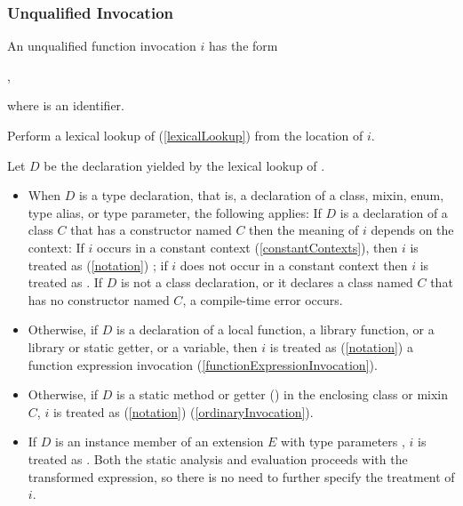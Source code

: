 \documentclass[makeidx]{article}
\begin{document}
{\subsubsection{Unqualified Invocation}

\LMHash{}%
An unqualified function invocation $i$ has the form

\noindent
{},

\noindent
where \id{} is an identifier.


\LMHash{}%
Perform a lexical lookup of \id{}
(\ref{lexicalLookup})
from the location of $i$.

\LMHash{}%
Let $D$ be the declaration yielded by the lexical lookup of \id.

\begin{itemize}
\item
  When $D$ is a type declaration, that is,
  a declaration of a class, mixin, enum, type alias, or type parameter,
  the following applies:
  If $D$ is a declaration of a class $C$
  that has a constructor named $C$
  then the meaning of $i$ depends on the context:
  If $i$ occurs in a constant context
  (\ref{constantContexts}),
  then $i$ is treated as
  (\ref{notation})
  ;
  if $i$ does not occur in a constant context
  then $i$ is treated as .
  If $D$ is not a class declaration,
  or it declares a class named $C$ that has no constructor named $C$,
  a compile-time error occurs.
\item
  Otherwise, if $D$ is a declaration of
  a local function,
  a library function, or
  a library or static getter, or a variable,
  then $i$ is treated as
  (\ref{notation})
  a function expression invocation
  (\ref{functionExpressionInvocation}).
\item
  Otherwise, if $D$ is
  a static method or getter
  ()
  in the enclosing class or mixin $C$,
  $i$ is treated as
  (\ref{notation})
  (\ref{ordinaryInvocation}).
\item
  If $D$ is an instance member of an extension $E$
  with type parameters ,
  $i$ is treated as .
  Both the static analysis and evaluation
  proceeds with the transformed expression,
  so there is no need to further specify the treatment of $i$.


\end{itemize}}
\end{document}
